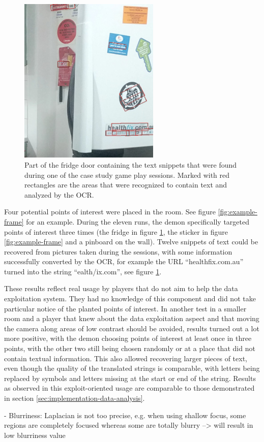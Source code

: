 \begin{figure}
    \includegraphics[height=8cm]{graphics/fridge.png}
    \caption{Part of the fridge door containing the text snippets that were found during one of the case study game play sessions. Marked with red rectangles are the areas that were recognized to contain text and analyzed by the OCR.}
    \label{fig:fridge}
\end{figure}

Four potential points of interest were placed in the room. See figure \ref{fig:example-frame} for an example. During the eleven runs, the demon specifically targeted points of interest three times (the fridge in figure \ref{fig:fridge}, the sticker in figure \ref{fig:example-frame} and a pinboard on the wall). 
Twelve snippets of text could be recovered from pictures taken during the sessions, with some information successfully converted by the OCR, for example the URL \enquote{healthfix.com.au} turned into the string \enquote{ealth/ix.com}, see figure \ref{fig:fridge}.

These results reflect real usage by players that do not aim to help the data exploitation system.
They had no knowledge of this component and did not take particular notice of the planted points of interest.
In another test in a smaller room and a player that knew about the data exploitation aspect and that moving the camera along areas of low contrast should be avoided, results turned out a lot more positive, with the demon choosing points of interest at least once in three points, with the other two still being chosen randomly or at a place that did not contain textual information.
This also allowed recovering larger pieces of text, even though the quality of the translated strings is comparable, with letters being replaced by symbols and letters missing at the start or end of the string.
Results as observed in this exploit-oriented usage are comparable to those demonstrated in section \ref{sec:implementation-data-analysis}.

- Blurriness: Laplacian is not too precise, e.g. when using shallow focus, some regions are completely focused whereas some are totally blurry
--> will result in low blurriness value


